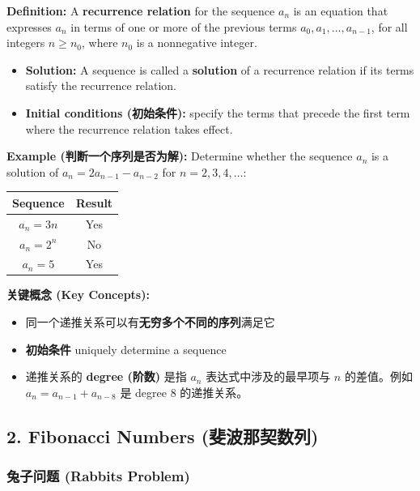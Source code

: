 \documentclass[10pt,a4paper,openany]{ctexbook}
\theoremstyle{definition}
\theoremstyle{remark}
\begin{document}
\textbf{Definition:} A \textbf{recurrence relation} for the sequence ${a_n}$ is an equation that expresses $a_n$ in terms of one or more of the previous terms $a_0, a_1, \dots, a_{n-1}$, for all integers $n \ge n_0$, where $n_0$ is a nonnegative integer.
\begin{itemize}
\item \textbf{Solution:} A sequence is called a \textbf{solution} of a recurrence relation if its terms satisfy the recurrence relation.
\item \textbf{Initial conditions (初始条件):} specify the terms that precede the first term where the recurrence relation takes effect.

\end{itemize}

\textbf{Example (判断一个序列是否为解):}
Determine whether the sequence ${a_n}$ is a solution of $a_n = 2a_{n-1} - a_{n-2}$ for $n = 2,3,4,\dots$:
\begin{center}
\begin{tabular}{cc}
\hline
Sequence & Result \\ \hline
$a_n = 3n$ & Yes \\
$a_n = 2^n$ & No \\
$a_n = 5$ & Yes \\
\hline
\end{tabular}

\end{center}

\textbf{关键概念 (Key Concepts):}
\begin{itemize}
\item 同一个递推关系可以有\textbf{无穷多个不同的序列}满足它
\item \textbf{初始条件} uniquely determine a sequence
\item 递推关系的 \textbf{degree (阶数)} 是指 $a_n$ 表达式中涉及的最早项与 $n$ 的差值。例如 $a_n = a_{n-1} + a_{n-8}$ 是 degree 8 的递推关系。

\end{itemize}

\vspace{-2pt}

\subsection{2. Fibonacci Numbers (斐波那契数列)}

\subsubsection{兔子问题 (Rabbits Problem)}
\end{document}
